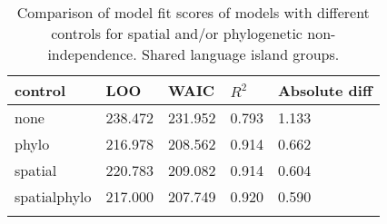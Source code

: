 \begin{longtable}{p{2cm}p{2cm}p{2cm}p{2cm}p{2cm}}
  \toprule
control & LOO & WAIC & $R^2$ & Absolute diff \\ 
  \midrule
none & 238.472 & 231.952 & 0.793 & 1.133 \\ 
  phylo & 216.978 & 208.562 & 0.914 & 0.662 \\ 
  spatial & 220.783 & 209.082 & 0.914 & 0.604 \\ 
  spatialphylo & 217.000 & 207.749 & 0.920 & 0.590 \\ 
   \bottomrule
\caption{Comparison of model fit scores of models with different controls for spatial and/or phylogenetic non-independence. Shared language island groups.} 
\label{model_fit_score_table_medium}
\end{longtable}
